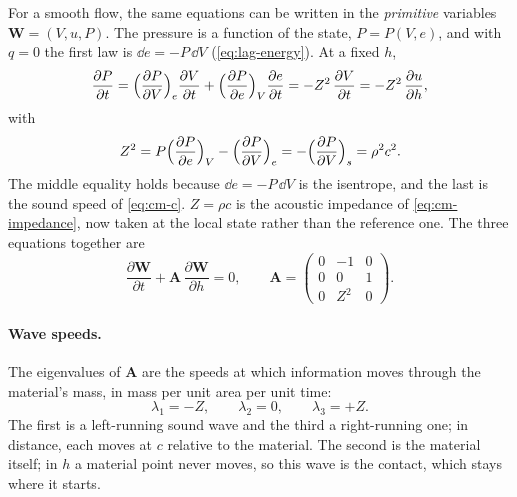 For a smooth flow, the same equations can be written in the
\emph{primitive} variables $\mathbf{W} = (V, u, P)$. The pressure is a
function of the state, $P = P(V, e)$, and with $q = 0$ the first law is
$\dd e = -P\,\dd V$ (\cref{eq:lag-energy}). At a fixed $h$,
\begin{equation}
\frac{\partial P}{\partial t}
  = \Bigl(\frac{\partial P}{\partial V}\Bigr)_e \frac{\partial V}{\partial t}
  + \Bigl(\frac{\partial P}{\partial e}\Bigr)_V \frac{\partial e}{\partial t}
  = -Z^2\,\frac{\partial V}{\partial t}
  = -Z^2\,\frac{\partial u}{\partial h},
\label{eq:rs-pressure}
\end{equation}
with
\begin{equation}
Z^2 = P\Bigl(\frac{\partial P}{\partial e}\Bigr)_V
      - \Bigl(\frac{\partial P}{\partial V}\Bigr)_e
    = -\Bigl(\frac{\partial P}{\partial V}\Bigr)_s
    = \rho^2 c^2 .
\label{eq:rs-z}
\end{equation}
The middle equality holds because $\dd e = -P\,\dd V$ is the isentrope, and
the last is the sound speed of \cref{eq:cm-c}. $Z = \rho c$ is the acoustic
impedance of \cref{eq:cm-impedance}, now taken at the local state rather
than the reference one. The three equations together are
\begin{equation}
\frac{\partial \mathbf{W}}{\partial t} + \mathbf{A}\,\frac{\partial \mathbf{W}}{\partial h} = 0,
\qquad
\mathbf{A} = \begin{pmatrix} 0 & -1 & 0 \\ 0 & 0 & 1 \\ 0 & Z^2 & 0 \end{pmatrix}.
\label{eq:rs-quasilinear}
\end{equation}

\paragraph{Wave speeds.} The eigenvalues of $\mathbf{A}$ are the speeds at
which information moves through the material's mass, in mass per unit area
per unit time:
\begin{equation}
\lambda_1 = -Z, \qquad \lambda_2 = 0, \qquad \lambda_3 = +Z .
\label{eq:rs-eigen}
\end{equation}
The first is a left-running sound wave and the third a right-running one;
in distance, each moves at $c$ relative to the material. The second is the
material itself; in $h$ a material point never moves, so this wave is the
contact, which stays where it starts.

